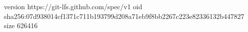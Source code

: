 version https://git-lfs.github.com/spec/v1
oid sha256:07d938014cf1371c711b193799d208a71eb9f8bb2267c223e82336132b447827
size 626416
